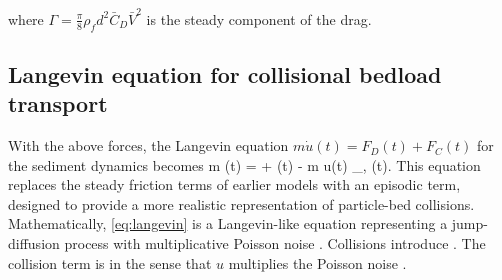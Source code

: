 where $\Gamma = \frac{\pi}{8}
\rho_f d^2 \bar{C}_D \bar{V}^2$ is the steady component of the drag.
\DIFaddbegin {}\DIFaddend 

\subsection{Langevin equation for collisional bedload transport}

With the above forces, the Langevin equation $m\dot{u}(t) = F_D(t) + F_C(t)$ for the sediment dynamics \DIFaddbegin {}\DIFaddend becomes
\be m (t) = \Gamma + \eta(t) - m u(t) \xi_{\nu, \ve}(t). \label{eq:langevin} \ee
This equation replaces the steady friction terms of earlier models with an episodic term, designed to provide a more realistic representation of particle-bed collisions.
Mathematically, \DIFdelbegin {}\DIFdelend \DIFaddbegin {}\DIFaddend \ref{eq:langevin} is a Langevin-like equation representing a jump-diffusion process \citep{Daly2006} with multiplicative Poisson noise \citep{Dubkov2016,Denisov2009}. 
Collisions introduce \DIFdelbegin {}\DIFdelend \DIFaddbegin {}\DIFaddend . The collision term is \DIFdelbegin {}\DIFdelend \DIFaddbegin {}\DIFaddend in the sense that $u$ multiplies the Poisson noise \DIFaddbegin {}\DIFaddend .

